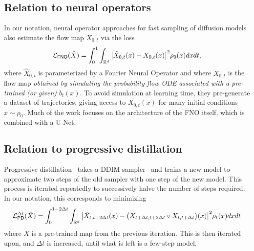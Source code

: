 \subsection{Relation to neural operators}
In our notation, neural operator approaches for fast sampling of diffusion models~\citep{zheng_fast_2023} also estimate the flow map $X_{0,t}$ via the loss
\begin{equation}
	\label{eqn:fno_loss}
	\mathcal{L}_{\mathsf{FNO}}(\hat X) = \int_0^1\int_{\mathbb{R}^d} \big|\hat X_{0, t}(x) - X_{0, t}(x)\big|^2 \rho_0(x) dx dt,
\end{equation}
where $\hat X_{0, t}$ is parameterized by a Fourier Neural Operator and where $X_{0, t}$ is the flow map \textit{obtained by simulating the probability flow ODE associated with a pre-trained (or given)} $b_t(x)$.
%
To avoid simulation at learning time, they pre-generate a dataset of trajectories, giving access to $X_{0, t}(x)$ for many initial conditions $x\sim \rho_0$.
%
Much of the work focuses on the architecture of the FNO itself, which is combined with a U-Net.

\subsection{Relation to progressive distillation}
Progressive distillation~\citep{salimans_progressive_2022} takes a DDIM sampler~\citep{song_denoising_2022} and trains a new model to approximate two steps of the old sampler with one step of the new model.
%
This process is iterated repeatedly to successively halve the number of steps required.
%
In our notation, this corresponds to minimizing
\begin{equation}
	\label{eqn:prog_dist}
	\mathcal{L}_{\mathsf{PD}}^{\Delta t}(\hat X) = \int_0^{1-2\Delta t}\int_{\mathbb{R}^d}\big|\hat X_{t, t+2\Delta t}(x) - \big(X_{t + \Delta t, t+2\Delta t}\circ X_{t, t+\Delta t}\big)(x)\big|^2\rho_t(x) dx dt
\end{equation}
where $X$ is a pre-trained map from the previous iteration.
%
This is then iterated upon, and $\Delta t$ is increased, until what is left is a few-step model.

